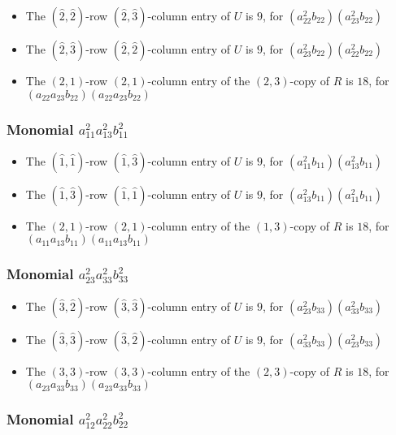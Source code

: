 \documentclass{article}
\begin{document}
\begin{itemize}
\item The $(\hat{2}, \hat{2})$-row $(\hat{2}, \hat{3})$-column entry of $U$ is $9$, for $( a_{22}^{2} b_{22} )( a_{23}^{2} b_{22} )$ 
\item The $(\hat{2}, \hat{3})$-row $(\hat{2}, \hat{2})$-column entry of $U$ is $9$, for $( a_{23}^{2} b_{22} )( a_{22}^{2} b_{22} )$ 
\item The $(2, 1)$-row $(2, 1)$-column entry of the $ \left(2, 3\right) $-copy of $R$ is $ 18 $, for $( a_{22} a_{23} b_{22} )( a_{22} a_{23} b_{22} )$ 
\end{itemize}
\subsubsection{Monomial $ a_{11}^{2} a_{13}^{2} b_{11}^{2} $}

\begin{itemize}
\item The $(\hat{1}, \hat{1})$-row $(\hat{1}, \hat{3})$-column entry of $U$ is $9$, for $( a_{11}^{2} b_{11} )( a_{13}^{2} b_{11} )$ 
\item The $(\hat{1}, \hat{3})$-row $(\hat{1}, \hat{1})$-column entry of $U$ is $9$, for $( a_{13}^{2} b_{11} )( a_{11}^{2} b_{11} )$ 
\item The $(2, 1)$-row $(2, 1)$-column entry of the $ \left(1, 3\right) $-copy of $R$ is $ 18 $, for $( a_{11} a_{13} b_{11} )( a_{11} a_{13} b_{11} )$ 
\end{itemize}
\subsubsection{Monomial $ a_{23}^{2} a_{33}^{2} b_{33}^{2} $}

\begin{itemize}
\item The $(\hat{3}, \hat{2})$-row $(\hat{3}, \hat{3})$-column entry of $U$ is $9$, for $( a_{23}^{2} b_{33} )( a_{33}^{2} b_{33} )$ 
\item The $(\hat{3}, \hat{3})$-row $(\hat{3}, \hat{2})$-column entry of $U$ is $9$, for $( a_{33}^{2} b_{33} )( a_{23}^{2} b_{33} )$ 
\item The $(3, 3)$-row $(3, 3)$-column entry of the $ \left(2, 3\right) $-copy of $R$ is $ 18 $, for $( a_{23} a_{33} b_{33} )( a_{23} a_{33} b_{33} )$ 
\end{itemize}
\subsubsection{Monomial $ a_{12}^{2} a_{22}^{2} b_{22}^{2} $}
\end{document}
